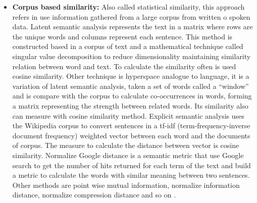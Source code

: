 \documentclass[12pt]{report}
\begin{document}
\begin{itemize}[nolistsep]
	\item \textbf{Corpus based similarity:} 
	Also called statistical similarity, this approach refers in use information gathered from a large corpus from written o spoken data. Latent semantic analysis represents the text in a matrix where rows are the unique words and columns represent each sentence. This method is constructed based in a corpus of text and a mathematical technique called singular value decomposition to reduce dimensionality maintaining similarity relation between word and text. To calculate the similarity often is used cosine similarity.  Other technique is hyperspace analogue to language, it is a variation of latent semantic analysis, taken a set of words called a ``window'' and is compare with the corpus to calculate co-occurrences in words, forming a matrix representing the strength between related words. Its similarity also can measure with cosine similarity method. Explicit semantic analysis uses the Wikipedia corpus to convert sentences in a tf-idf (term-frequency-inverse document frequency) weighted vector between each word and the documents of corpus. The measure to calculate the distance between vector is cosine similarity. Normalize Google distance is a semantic metric that use Google search to get the number of hits returned for each term of the text and build a metric to calculate the words with similar meaning between two sentences. Other methods are point wise mutual information, normalize information distance, normalize compression distance and so on \cite{Ganesan2015} \cite{ Zhang2015} \cite{Gomaa2013} \cite{Majumder2016}.
	

\end{itemize}
\end{document}
